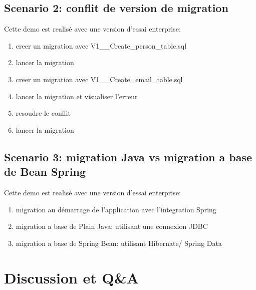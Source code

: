 \documentclass[slidestop,compress,11pt,xcolor=dvipsnames,french]{beamer}
\begin{document}
\subsection*{Scenario 2: conflit de version de migration}
\begin{frame}
Cette demo est realisé avec une version d'essai enterprise: 
\begin{enumerate}
 \item creer un migration avec V1\_\_Create\_person\_table.sql 
 \item lancer la migration
 \item creer un migration avec V1\_\_Create\_email\_table.sql
 \item lancer la migration et visualiser l'erreur
 \item resoudre le conflit
 \item lancer la migration
\end{enumerate}
\end{frame}
\subsection*{Scenario 3: migration Java vs migration a base de Bean Spring}
\begin{frame}
Cette demo est realisé avec une version d'essai enterprise: 
\begin{enumerate}
 \item migration au démarrage de l'application avec l'integration Spring
 \item migration a base de Plain Java: utilisant une connexion JDBC
 \item migration a base de Spring Bean: utilisant Hibernate/ Spring Data
\end{enumerate}
\end{frame}

\section[Discussion]{Discussion et Q\&A}
\end{document}
